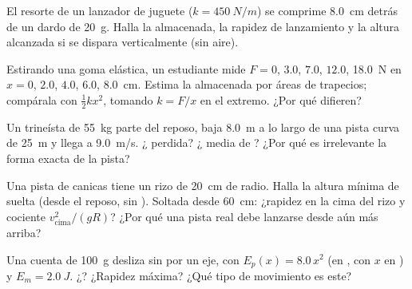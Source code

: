 \begin{exercise}[$\star\star$]\label{exo:g12:work-and-energy:6}
El resorte de un lanzador de juguete ($k = \qty{450}{N/m}$) se comprime \qty{8.0}{cm}
detrás de un dardo de \qty{20}{g}. Halla la  almacenada, la rapidez de
lanzamiento y la altura alcanzada si se dispara verticalmente (sin aire).
\end{exercise}

\begin{exercise}[$\star\star$]\label{exo:g12:work-and-energy:7}
Estirando una goma elástica, un estudiante mide $F = 0$, $3.0$, $7.0$, $12.0$,
\qty{18.0}{N} en $x = 0$, $2.0$, $4.0$, $6.0$, \qty{8.0}{cm}. Estima la 
almacenada por áreas de trapecios; compárala con $\tfrac12 kx^2$, tomando $k = F/x$ en
el extremo. ¿Por qué difieren?
\end{exercise}

\begin{exercise}[$\star\star$]\label{exo:g12:work-and-energy:8}
Un trineísta de \qty{55}{kg} parte del reposo, baja \qty{8.0}{m} a lo largo de una
pista curva de \qty{25}{m} y llega a \qty{9.0}{m/s}. ¿ perdida?
¿ media de ? ¿Por qué es irrelevante la forma exacta de la pista?
\end{exercise}

\begin{exercise}[$\star\star$]\label{exo:g12:work-and-energy:9}
Una pista de canicas tiene un rizo de \qty{20}{cm} de radio. Halla la altura mínima de
suelta (desde el reposo, sin ). Soltada desde \qty{60}{cm}: ¿rapidez en la
cima del rizo y cociente $v_{\text{cima}}^2/(gR)$? ¿Por qué una pista real debe
lanzarse desde aún más arriba?
\end{exercise}

\begin{exercise}[$\star\star$]\label{exo:g12:work-and-energy:10}
Una cuenta de \qty{100}{g} desliza sin  por un eje, con
$E_p(x) = 8.0\,x^2$ (en , con $x$ en ) y $E_m = \qty{2.0}{J}$. ¿? ¿Rapidez máxima? ¿Qué tipo de movimiento es este?
\end{exercise}


